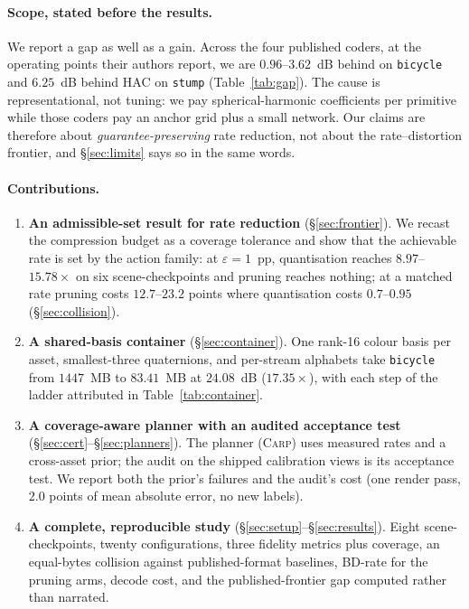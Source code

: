 \documentclass[preprint,number,3p]{elsarticle}
\newcommand{\carp}{\textsc{Carp}}
\begin{document}
\paragraph{Scope, stated before the results.} We report a gap as well as a gain. Across the four published coders, at
the operating points their authors report, we are $0.96$--$3.62$~dB behind on \texttt{bicycle} and $6.25$~dB behind
HAC on \texttt{stump} (Table~\ref{tab:gap}). The
cause is representational, not tuning: we pay spherical-harmonic coefficients per
primitive while those coders pay an anchor grid plus a small network. Our claims are therefore about
\emph{guarantee-preserving} rate reduction, not about the rate--distortion frontier, and \S\ref{sec:limits} says so
in the same words.

\paragraph{Contributions.}
\begin{enumerate}
  \item \textbf{An admissible-set result for rate reduction} (\S\ref{sec:frontier}). We recast the compression budget
  as a coverage tolerance and show that the achievable rate is set by the action family: at $\varepsilon = 1$~pp,
  quantisation reaches $8.97$--$15.78\times$ on six scene-checkpoints and pruning reaches nothing; at a matched rate
  pruning costs $12.7$--$23.2$ points where quantisation costs $0.7$--$0.95$ (\S\ref{sec:collision}).
  \item \textbf{A shared-basis container} (\S\ref{sec:container}). One rank-16 colour basis per asset, smallest-three
  quaternions, and per-stream alphabets take \texttt{bicycle} from $1447$~MB to $83.41$~MB at $24.08$~dB
  ($17.35\times$), with each step of the ladder attributed in Table~\ref{tab:container}.
  \item \textbf{A coverage-aware planner with an audited acceptance test} (\S\ref{sec:cert}--\S\ref{sec:planners}).
  The planner (\carp{}) uses measured rates and a cross-asset prior; the audit on the shipped calibration views is its
  acceptance test. We report both the prior's failures and the audit's cost (one render pass, $2.0$ points of mean
  absolute error, no new labels).
  \item \textbf{A complete, reproducible study} (\S\ref{sec:setup}--\S\ref{sec:results}). Eight
  scene-checkpoints, twenty configurations, three fidelity metrics plus coverage, an equal-bytes collision against
  published-format baselines, BD-rate for the pruning arms, decode cost, and the published-frontier gap computed
  rather than narrated.
\end{enumerate}
\end{document}
